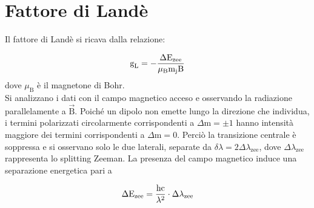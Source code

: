 \documentclass[twocolumn,10pt]{asme2ej}
\begin{document}
\cleardoublepage
\section{Fattore di Landè}\label{s:lande}

Il fattore di Landè si ricava dalla relazione: 

\vspace{-15pt}
\begin{equation}
    \text{g}_{\text{L}} = - \frac{\Delta \text{E}_{\text{zee}}}{\mu_{\text{B}} \text{m}_{\text{j}} \text{B} }
    \label{e:gL}
\vspace{-5pt}
\end{equation}
dove $\mu_{\text{B}}$ è il magnetone di Bohr. \\
Si analizzano i dati con il campo magnetico acceso e osservando la radiazione parallelamente a
$\vec{\text{B}}$. Poiché un dipolo non emette lungo la direzione che individua, i termini polarizzati circolarmente
corrispondenti a $\Delta \text{m} = \pm 1$ hanno intensità maggiore dei termini corrispondenti a $\Delta \text{m} = 0$.
Perciò la transizione centrale è soppressa e si osservano solo le due laterali, separate da $\delta\lambda = 2
\Delta\lambda_{\text{zee}}$, dove $\Delta\lambda_{\text{zee}}$ rappresenta lo splitting Zeeman. La presenza del 
campo magnetico induce una separazione energetica pari a 

\vspace{-15pt}
\begin{equation}
    \Delta \text{E}_{\text{zee}} = \frac{\text{hc}}{\lambda^2} \cdot \Delta\lambda_{\text{zee}}
    \label{e:dEzee}
\vspace{-5pt}
\end{equation}
\end{document}
